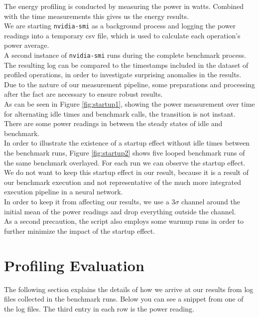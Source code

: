 The energy profiling is conducted by measuring the power in watts. Combined with the time measurements this gives us the energy results. \\
We are starting \texttt{nvidia-smi} as a background process and logging the power readings into a temporary csv file, which is used to calculate each operation's power average. \\
A second instance of \texttt{nvidia-smi} runs during the complete benchmark process. The resulting log can be compared to the timestamps included in the dataset of profiled operations, in order to investigate surprising anomalies in the results. \\
Due to the nature of our measurement pipeline, some preparations and processing after the fact are necessary to ensure robust results. \\
As can be seen in Figure \ref{fig:startup1}, showing the power measurement over time for alternating idle times and benchmark calls, the transition is not instant. There are some power readings in between the steady states of idle and benchmark. \\
In order to illustrate the existence of a startup effect without idle times between the benchmark runs, Figure \ref{fig:startup2} shows five looped benchmark runs of the same benchmark overlayed. For each run we can observe the startup effect. \\
We do not want to keep this startup effect in our result, because it is a result of our benchmark execution and not representative of the much more integrated execution pipeline in a neural network.\\
In order to keep it from affecting our results, we use a $3\sigma$ channel around the initial mean of the power readings and drop everything outside the channel. \\
As a second precaution, the script also employs some warmup runs in order to further minimize the impact of the startup effect.\\



\section{Profiling Evaluation}


The following section explains the details of how we arrive at our results from log files collected in the benchmark runs. Below you can see a snippet from one of the log files. The third entry in each row is the power reading.

